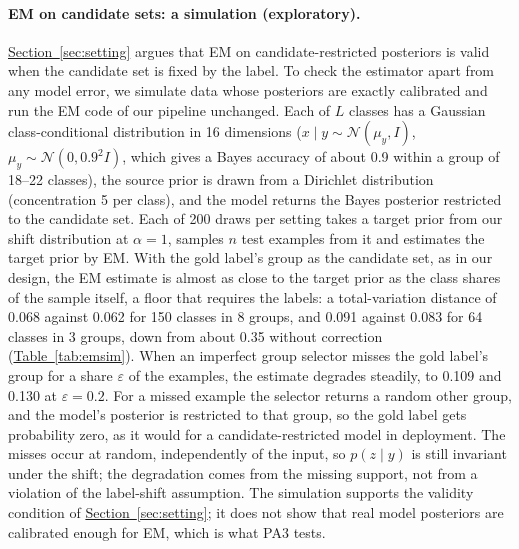 \paragraph{EM on candidate sets: a simulation (exploratory).}
\hyperref[sec:setting]{Section~\ref*{sec:setting}} argues that EM on candidate-restricted posteriors is valid when the
candidate set is fixed by the label. To check the estimator apart from any model error, we simulate data whose
posteriors are exactly calibrated and run the EM code of our pipeline unchanged. Each of $L$ classes has a Gaussian
class-conditional distribution in 16 dimensions ($x\mid y\sim\mathcal N(\mu_y, I)$, $\mu_y\sim\mathcal N(0, 0.9^2 I)$,
which gives a Bayes accuracy of about 0.9 within a group of 18--22 classes), the source prior is drawn from a Dirichlet distribution
(concentration 5 per class), and the model returns the Bayes posterior restricted to the candidate set. Each of 200
draws per setting takes a target prior from our shift distribution at $\alpha=1$, samples $n$ test examples from it and
estimates the target prior by EM. With the gold label's group as the candidate set, as in our design, the EM estimate
is almost as close to the target prior as the class shares of the sample itself, a floor that requires the labels: a
total-variation distance of 0.068 against 0.062 for 150 classes in 8 groups, and 0.091 against 0.083 for 64
classes in 3 groups, down from about 0.35 without correction (\hyperref[tab:emsim]{Table~\ref*{tab:emsim}}). When an
imperfect group selector misses the gold label's group for a share $\varepsilon$ of the examples, the estimate degrades
steadily, to 0.109 and 0.130 at $\varepsilon=0.2$. For a missed example the selector returns a random other group, and
the model's posterior is restricted to that group, so the gold label gets probability zero, as it would for a
candidate-restricted model in deployment. The misses occur at random, independently of the input, so $p(z\mid y)$ is
still invariant under the shift; the degradation comes from the missing support, not from a violation of the label-shift
assumption. The simulation supports the validity condition of
\hyperref[sec:setting]{Section~\ref*{sec:setting}}; it does not show that real model posteriors are calibrated enough
for EM, which is what PA3 tests.

\begin{table}[htbp]
  \centering
  \caption{\textbf{With the gold label's group as candidate set, EM recovers the target prior almost as well as the
  sample's own class shares; an imperfect group selector degrades it (exploratory simulation).} Total-variation distance
  to the target prior, mean over 200 draws at $\alpha=1$, of: the source prior (no correction); the class shares of the
  sample (labels known, the sampling floor); and the EM estimate with the candidate set from the gold label's group or
  from a selector that misses that group for a share $\varepsilon$ of the examples (realised share of misses in
  brackets), whose gold label then gets probability zero. Exactly calibrated synthetic posteriors; $n$ as in the test sets of CLINC150, HWU64 and FPB.}
  \label{tab:emsim}
  \scriptsize
  \setlength{\tabcolsep}{4pt}
  
\end{table}

